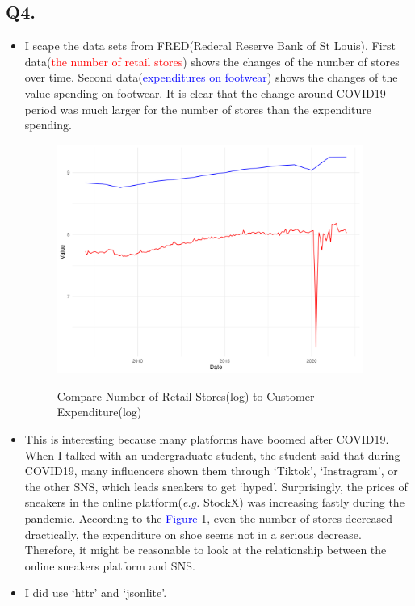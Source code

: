 \documentclass{article}
\begin{document}
\begin{large}
		\section*{Q4.}
		\begin{itemize}
			\item I scape the data sets from FRED(Rederal Reserve Bank of St Louis). First data(\textcolor{red}{the number of retail stores}) shows the changes of the number of stores over time. Second data(\textcolor{blue}{expenditures on footwear}) shows the changes of the value spending on footwear. It is clear that the change around COVID19 period was much larger for the number of stores than the expenditure spending.
				\begin{figure}[h]
				\caption{Compare Number of Retail Stores(log) to Customer Expenditure(log)}
				\centering
				\includegraphics[width = 100mm]{plot.png}
				\label{fig2}
			\end{figure}
			\item This is interesting because many platforms have boomed after COVID19. When I talked with an undergraduate student, the student said that during COVID19, many influencers shown them through `Tiktok', `Instragram', or the other SNS, which leads sneakers to get `hyped'. Surprisingly, the prices of sneakers in the online platform(\textit{e.g.} StockX) was increasing fastly during the pandemic. According to the \textcolor{blue}{Figure} \ref{fig2}, even the number of stores decreased dractically, the expenditure on shoe seems not in a serious decrease. Therefore, it might be reasonable to look at the relationship between the online sneakers platform and SNS.
			\item I did use `httr' and `jsonlite'.
		\end{itemize}
		
		
		
		
		
	\end{large}
\end{document}
